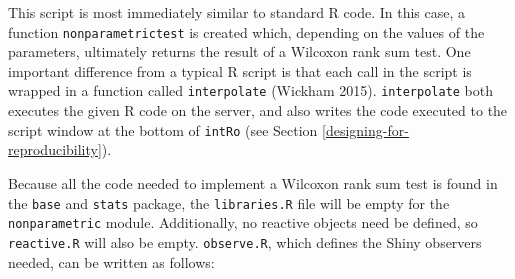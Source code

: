 \documentclass[12pt,]{article}
\newenvironment{Shaded}{\begin{snugshade}}{\end{snugshade}}
\newcommand{\KeywordTok}[1]{\textcolor[rgb]{0.13,0.29,0.53}{\textbf{{#1}}}}
\newcommand{\DataTypeTok}[1]{\textcolor[rgb]{0.13,0.29,0.53}{{#1}}}
\newcommand{\StringTok}[1]{\textcolor[rgb]{0.31,0.60,0.02}{{#1}}}
\newcommand{\NormalTok}[1]{{#1}}
\begin{document}
\begin{Shaded}
\end{Shaded}

This script is most immediately similar to standard R code. In this
case, a function \texttt{nonparametrictest} is created which, depending
on the values of the parameters, ultimately returns the result of a
Wilcoxon rank sum test. One important difference from a typical R script
is that each call in the script is wrapped in a function called
\texttt{interpolate} (Wickham 2015). \texttt{interpolate} both executes
the given R code on the server, and also writes the code executed to the
script window at the bottom of \texttt{intRo} (see Section
\ref{designing-for-reproducibility}).

Because all the code needed to implement a Wilcoxon rank sum test is
found in the \texttt{base} and \texttt{stats} package, the
\texttt{libraries.R} file will be empty for the \texttt{nonparametric}
module. Additionally, no reactive objects need be defined, so
\texttt{reactive.R} will also be empty. \texttt{observe.R}, which
defines the Shiny observers needed, can be written as follows:
\end{document}
